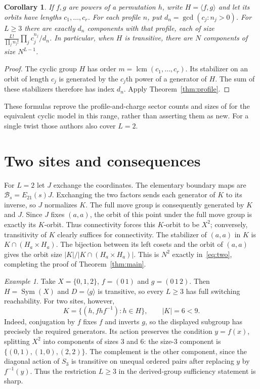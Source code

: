 \documentclass[11pt]{article}
\newtheorem{corollary}[theorem]{Corollary}
\theoremstyle{remark}
\newtheorem{example}[theorem]{Example}
\DeclareMathOperator{\Sym}{Sym}
\newcommand{\twist}{\mathcal{B}}
\begin{document}
\begin{corollary}\label{cor:cyclic}
If $f,g$ are powers of a permutation $h$, write $H=\langle f,g\rangle$
and let its orbits have lengths $c_1,\ldots,c_r$.
For each profile $n$, put $d_n=\gcd(c_j:n_j>0)$.
For $L\geq3$ there are exactly $d_n$ components with that profile,
each of size $\frac{L!}{\prod_j n_j!}\prod_j c_j^{n_j}/d_n$.
In particular, when $H$ is transitive, there are $N$ components of size
$N^{L-1}$.
\end{corollary}
\begin{proof}
The cyclic group $H$ has order $m=\operatorname{lcm}(c_1,\ldots,c_r)$.
Its stabilizer on an orbit of length $c_j$ is generated by the $c_j$th
power of a generator of $H$. The sum of these stabilizers therefore has
index $d_n$. Apply Theorem~\ref{thm:profile}.
\end{proof}
These formulas reprove the profile-and-charge sector counts and sizes of
\cite[Propositions~4.9, 4.10 and 4.14]{DPR} for the equivalent cyclic model
in this range, rather than asserting them as new. For a single twist those
authors also cover $L=2$.

\section{Two sites and consequences}
For $L=2$ let $J$ exchange the coordinates. The elementary boundary maps are
$\twist_s=E_{21}(s)J$. Exchanging the two factors sends each generator of $K$
to its inverse, so $J$ normalizes $K$. The full move group is consequently
generated by $K$ and $J$.
Since $J$ fixes $(a,a)$, the orbit of this point under the full move group is
exactly its $K$-orbit. Thus connectivity forces this $K$-orbit to be $X^2$;
conversely, transitivity of $K$ clearly suffices for connectivity.
The stabilizer of $(a,a)$ in $K$ is $K\cap(H_a\times H_a)$.
The bijection between its left cosets and the orbit of $(a,a)$ gives the
orbit size $|K|/|K\cap(H_a\times H_a)|$.
This is $N^2$ exactly in~\eqref{eq:two}, completing the proof of
Theorem~\ref{thm:main}.

\begin{example}\label{ex:three}
Take $X=\{0,1,2\}$, $f=(0\,1)$ and $g=(0\,1\,2)$.
Then $H=\Sym(X)$ and $D=\langle g\rangle$ is transitive, so every $L\geq3$
has full switching reachability. For two sites, however,
\[
 K=\{(h,fhf^{-1}):h\in H\},\qquad |K|=6<9.
\]
Indeed, conjugation by $f$ fixes $f$ and inverts $g$, so the displayed subgroup
has precisely the required generators. Its action preserves the condition
$y=f(x)$, splitting $X^2$ into components of sizes $3$ and $6$:
the size-$3$ component is $\{(0,1),(1,0),(2,2)\}$.
The complement is the other component, since the diagonal action of $S_3$
is transitive on unequal ordered pairs after replacing $y$ by $f^{-1}(y)$.
Thus the restriction $L\geq3$ in the derived-group sufficiency statement is sharp.
\end{example}
\end{document}
